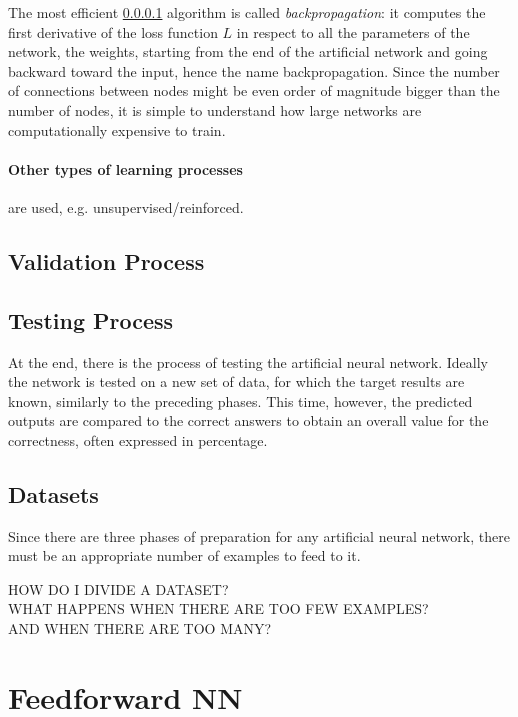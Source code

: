 The most efficient \ref{} algorithm is called \textit{backpropagation}: it computes the first derivative of the loss function $L$ in respect to all the parameters of the network, the weights, starting from the end of the artificial network and going backward toward the input, hence the name backpropagation.
Since the number of connections between nodes might be even order of magnitude bigger than the number of nodes, it is simple to understand how large networks are computationally expensive to train.

\paragraph{Other types of learning processes} are used, e.g. unsupervised/reinforced.

\subsection{Validation Process}
\label{ssec:Validation_Process}

\subsection{Testing Process}
\label{ssec:Testing_Process}
At the end, there is the process of testing the artificial neural network.
Ideally the network is tested on a new set of data, for which the target results are known, similarly to the preceding phases.
This time, however, the predicted outputs are compared to the correct answers to obtain an overall value for the correctness, often expressed in percentage.

\subsection{Datasets}
\label{ssec:Datasets}
Since there are three phases of preparation for any artificial neural network, there must be an appropriate number of examples to feed to it.

\noindent\uppercase{\normalsize{how do i divide a dataset?\\ what happens when there are too few examples?\\ And when there are too many?}}
\normalsize

\section{Feedforward NN}
\label{sec:Feedforward_NN}

